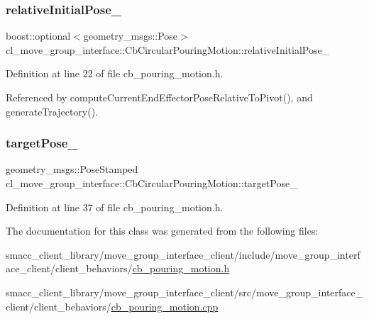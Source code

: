 \subsubsection{\texorpdfstring{relative\+Initial\+Pose\+\_\+}{relativeInitialPose\_}}
{\footnotesize\ttfamily boost\+::optional$<$geometry\+\_\+msgs\+::\+Pose$>$ cl\+\_\+move\+\_\+group\+\_\+interface\+::\+Cb\+Circular\+Pouring\+Motion\+::relative\+Initial\+Pose\+\_\+}



Definition at line 22 of file cb\+\_\+pouring\+\_\+motion.\+h.



Referenced by compute\+Current\+End\+Effector\+Pose\+Relative\+To\+Pivot(), and generate\+Trajectory().

\mbox{\label{classcl__move__group__interface_1_1CbCircularPouringMotion_a23f3e511fbb975b090aa96873f18700a}} 
\subsubsection{\texorpdfstring{target\+Pose\+\_\+}{targetPose\_}}
{\footnotesize\ttfamily geometry\+\_\+msgs\+::\+Pose\+Stamped cl\+\_\+move\+\_\+group\+\_\+interface\+::\+Cb\+Circular\+Pouring\+Motion\+::target\+Pose\+\_\+\hspace{0.3cm}{\ttfamily [protected]}}



Definition at line 37 of file cb\+\_\+pouring\+\_\+motion.\+h.



The documentation for this class was generated from the following files\+:\begin{DoxyCompactItemize}
\item 
smacc\+\_\+client\+\_\+library/move\+\_\+group\+\_\+interface\+\_\+client/include/move\+\_\+group\+\_\+interface\+\_\+client/client\+\_\+behaviors/\hyperlink{cb__pouring__motion_8h}{cb\+\_\+pouring\+\_\+motion.\+h}\item 
smacc\+\_\+client\+\_\+library/move\+\_\+group\+\_\+interface\+\_\+client/src/move\+\_\+group\+\_\+interface\+\_\+client/client\+\_\+behaviors/\hyperlink{cb__pouring__motion_8cpp}{cb\+\_\+pouring\+\_\+motion.\+cpp}\end{DoxyCompactItemize}
